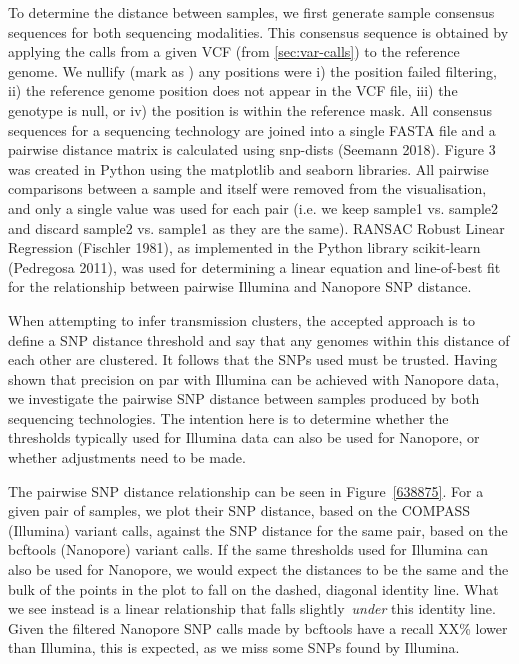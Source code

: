 To determine the distance between samples, we first generate sample consensus sequences for both sequencing modalities. This consensus sequence is obtained by applying the calls from a given VCF (from \autoref{sec:var-calls}) to the \mtb{} reference genome. We nullify (mark as ) any positions were i) the position failed filtering, ii) the reference genome position does not appear in the VCF file, iii) the genotype is null, or iv) the position is within the reference mask. All consensus sequences for a sequencing technology are joined into a single FASTA file and a pairwise distance matrix is calculated using snp-dists (Seemann 2018).
Figure 3 was created in Python using the matplotlib and seaborn libraries. All pairwise comparisons between a sample and itself were removed from the visualisation, and only a single value was used for each pair (i.e. we keep sample1 vs. sample2 and discard sample2 vs. sample1 as they are the same). RANSAC Robust Linear Regression (Fischler 1981), as implemented in the Python library scikit-learn (Pedregosa 2011), was used for determining a linear equation and line-of-best fit for the relationship between pairwise Illumina and Nanopore SNP distance.

When attempting to infer transmission clusters, the accepted approach is
to define a SNP distance threshold and say that any genomes within this
distance of each other are clustered. It follows that the SNPs used must
be trusted. Having shown that precision on par with Illumina can be
achieved with Nanopore data, we investigate the pairwise SNP distance
between samples produced by both sequencing technologies. The intention
here is to determine whether the thresholds typically used for Illumina
data can also be used for Nanopore, or whether adjustments need to be
made.

The pairwise SNP distance relationship can be seen in
Figure~{\ref{638875}}. For a given pair of samples, we
plot their SNP distance, based on the COMPASS (Illumina) variant calls,
against the SNP distance for the same pair, based on the bcftools
(Nanopore) variant calls. If the same thresholds used for Illumina can
also be used for Nanopore, we would expect the distances to be the same
and the bulk of the points in the plot to fall on the dashed, diagonal
identity line. What we see instead is a linear relationship that falls
slightly~\emph{under} this identity line. Given the filtered Nanopore
SNP calls made by bcftools have a recall XX\% lower than Illumina, this
is expected, as we miss some SNPs found by Illumina.

